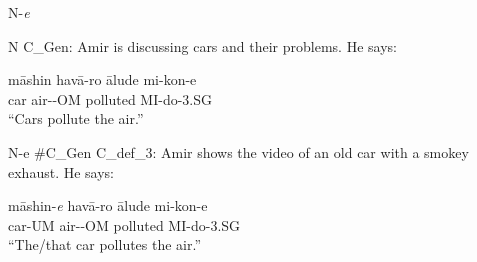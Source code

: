 \documentclass[10pt]{beamer}
\begin{document}
\begin {frame} {N-\emph{{\color {red}e}}}

\begin {exampleblock} {N}
{\small C_{Gen}: Amir is discussing cars and their problems. He says:}
	\begin {exe}
		\ex \label{} \gll	m\={a}shin	hav\={a}-ro	\={a}lude	mi-kon-e\\
			car	air-{\scriptsize -OM}	polluted	{\scriptsize MI-}do{\scriptsize -3.SG}\\
			``Cars pollute the air.''\\
	\end {exe}
\end {exampleblock}

\pause

\begin {exampleblock} {N-{\color {red}e}}
{\small {\color {gray}\#C_{Gen}}}
{\small C_{def_3}: Amir shows the video of an old car with a smokey exhaust. He says:}

	\begin {exe}
		\ex \label{} \gll	m\={a}shin-\emph{{\color {red}e}}	hav\={a}-ro	\={a}lude	mi-kon-e\\
			car-{\scriptsize UM}	air-{\scriptsize -OM}	polluted	{\scriptsize MI-}do{\scriptsize -3.SG}\\
			``The/that car pollutes the air.''\\
	\end {exe}
\end {exampleblock}

\end {frame}
\end{document}
